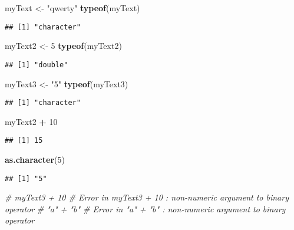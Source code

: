 \documentclass[]{book}
\newenvironment{Shaded}{\begin{snugshade}}{\end{snugshade}}
\newcommand{\KeywordTok}[1]{\textcolor[rgb]{0.13,0.29,0.53}{\textbf{#1}}}
\newcommand{\DecValTok}[1]{\textcolor[rgb]{0.00,0.00,0.81}{#1}}
\newcommand{\StringTok}[1]{\textcolor[rgb]{0.31,0.60,0.02}{#1}}
\newcommand{\CommentTok}[1]{\textcolor[rgb]{0.56,0.35,0.01}{\textit{#1}}}
\newcommand{\OperatorTok}[1]{\textcolor[rgb]{0.81,0.36,0.00}{\textbf{#1}}}
\newcommand{\NormalTok}[1]{#1}
\theoremstyle{definition}
\theoremstyle{definition}
\theoremstyle{definition}
\theoremstyle{remark}
\begin{document}
\begin{Shaded}
\begin{Highlighting}[]
\NormalTok{myText <-}\StringTok{ "qwerty"}
\KeywordTok{typeof}\NormalTok{(myText)}
\end{Highlighting}
\end{Shaded}

\begin{verbatim}
## [1] "character"
\end{verbatim}

\begin{Shaded}
\begin{Highlighting}[]
\NormalTok{myText2 <-}\StringTok{ }\DecValTok{5}
\KeywordTok{typeof}\NormalTok{(myText2)}
\end{Highlighting}
\end{Shaded}

\begin{verbatim}
## [1] "double"
\end{verbatim}

\begin{Shaded}
\begin{Highlighting}[]
\NormalTok{myText3 <-}\StringTok{ "5"}
\KeywordTok{typeof}\NormalTok{(myText3)}
\end{Highlighting}
\end{Shaded}

\begin{verbatim}
## [1] "character"
\end{verbatim}

\begin{Shaded}
\begin{Highlighting}[]
\NormalTok{myText2 }\OperatorTok{+}\StringTok{ }\DecValTok{10}
\end{Highlighting}
\end{Shaded}

\begin{verbatim}
## [1] 15
\end{verbatim}

\begin{Shaded}
\begin{Highlighting}[]
\KeywordTok{as.character}\NormalTok{(}\DecValTok{5}\NormalTok{)}
\end{Highlighting}
\end{Shaded}

\begin{verbatim}
## [1] "5"
\end{verbatim}

\begin{Shaded}
\begin{Highlighting}[]
\CommentTok{# myText3 + 10 # Error in myText3 + 10 : non-numeric argument to binary operator}
\CommentTok{# "a" + "b" # Error in "a" + "b" : non-numeric argument to binary operator}
\end{Highlighting}
\end{Shaded}
\end{document}
